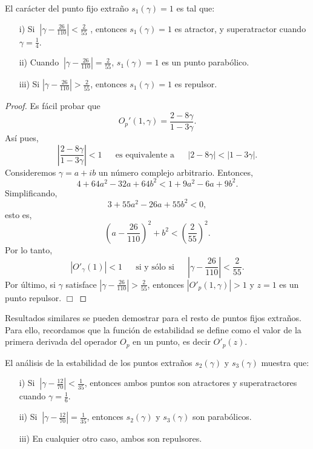 \begin{theorem}\label{teoestabilidad1}
	El carácter del punto fijo extraño $s_1(\gamma)=1$ es tal que:
	\begin{itemize}
		\item[i)] Si  $\ \left|\gamma-\frac{26}{110}\right|<\frac{2}{55}$ , entonces $s_1(\gamma)=1$ es atractor, y superatractor cuando $\gamma=\frac{1}{4}$.
		\item[ii)]  Cuando $\ \left|\gamma-\frac{26}{110}\right|=\frac{2}{55}$,  $s_1(\gamma)=1$ es un punto parabólico.
		\item[iii)] Si $\left|\gamma-\frac{26}{110}\right|>\frac{2}{55}$, entonces $s_1(\gamma)=1$ es repulsor.
	\end{itemize}
\end{theorem}
\begin{proof} Es fácil probar que
\[
O_{p}'\left( 1,\gamma\right) =\frac{2-8 \gamma }{1-3 \gamma }.
\]
Así pues,
\[
\left| \frac{2-8 \gamma }{1-3 \gamma }\right| < 1\phantom{aaa}
\mbox{es equivalente a} \phantom{aaa}  \left|2-8\gamma\right|< \left|1-3\gamma\right| .
\]
Consideremos $\gamma=a+ib$ un número complejo arbitrario. Entonces,
\[
4+64a^2-32a+64b^2<1+9a^2-6a+9b^2.
\]
Simplificando,
\[
3+55a^2-26a+55b^2<0,
\]
esto es,
\[
{\left(a-\frac{26}{110}\right)}^2+b^2<{\left(\frac{2}{55}\right)}^2.
\]
Por lo tanto,
\[
\left|O'_\gamma (1)\right|<1 \phantom{aaa} \mbox{si y sólo si} \phantom{aaa}
\left|\gamma-\frac{26}{110}\right|<\frac{2}{55}.
\]
Por último, si $\gamma$ satisface $\left|\gamma-\frac{26}{110}\right|>\frac{2}{55}$, entonces $\left|O'_p (1,\gamma)\right|>1$ y $z=1$ es un punto repulsor. $\Box$
\vspace{.5cm}
\end{proof}

Resultados similares se pueden demostrar para el resto de puntos fijos extraños. Para ello, recordamos que la función de estabilidad se define como el valor de la primera derivada del operador $O_p$ en un punto, es decir $O'_p(z)$.
\begin{theorem}\label{teoestabilidad2}
	El análisis de la estabilidad de los puntos extraños $s_2(\gamma)$ y $s_3(\gamma)$ muestra que:
	\begin{itemize}
		\item [i)] Si $\ \left|\gamma-\frac{12}{70}\right|<\frac{1}{35}$, entonces ambos puntos son atractores y superatractores cuando $\gamma=\frac{1}{6}$.
		\item [ii)] Si $\ \left|\gamma-\frac{12}{70}\right|=\frac{1}{35}$,  entonces $s_2(\gamma)$ y $s_3(\gamma)$ son parabólicos.
		\item [iii)] En cualquier otro caso, ambos son repulsores.
	\end{itemize}
\end{theorem}

